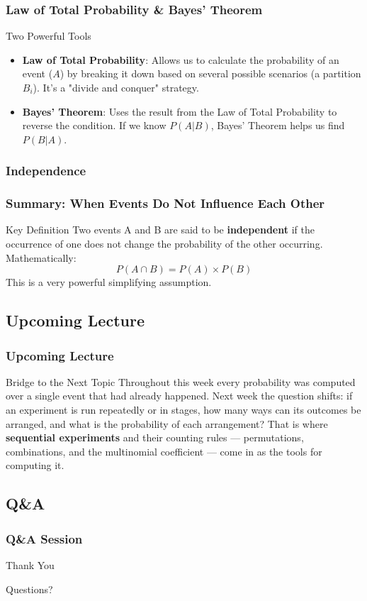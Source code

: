 \begin{frame}[t]
\frametitle{Law of Total Probability \& Bayes' Theorem}
    \begin{block}{Two Powerful Tools}
        \begin{itemize}
            \item \textbf{Law of Total Probability}: Allows us to calculate the probability of an event ($A$) by breaking it down based on several possible scenarios (a partition $B_i$). It's a "divide and conquer" strategy.
            \item \textbf{Bayes' Theorem}: Uses the result from the Law of Total Probability to reverse the condition. If we know $P(A|B)$, Bayes' Theorem helps us find $P(B|A)$.
        \end{itemize}
    \end{block}
\end{frame}

\begin{frame}[t]
\frametitle{Independence}
    \frametitle{Summary: When Events Do Not Influence Each Other}
    \begin{block}{Key Definition}
        Two events A and B are said to be \textbf{independent} if the occurrence of one does not change the probability of the other occurring. Mathematically:
        \[ P(A \cap B) = P(A) \times P(B) \]
        This is a very powerful simplifying assumption.
    \end{block}
\end{frame}

\subsection{Upcoming Lecture}
\begin{frame}[t]
\frametitle{Upcoming Lecture}
\begin{alertblock}{Bridge to the Next Topic}
    Throughout this week every probability was computed over a single event that had already happened. Next week the question shifts: if an experiment is run repeatedly or in stages, how many ways can its outcomes be arranged, and what is the probability of each arrangement? That is where \textbf{sequential experiments} and their counting rules --- permutations, combinations, and the multinomial coefficient --- come in as the tools for computing it.
\end{alertblock}
\end{frame}

\subsection{Q\&A}
\begin{frame}[fragile]
\frametitle{Q\&A Session}
    \begin{center}
        \Huge Thank You
        \vspace{2cm}
        
        Questions?
    \end{center}
\end{frame}